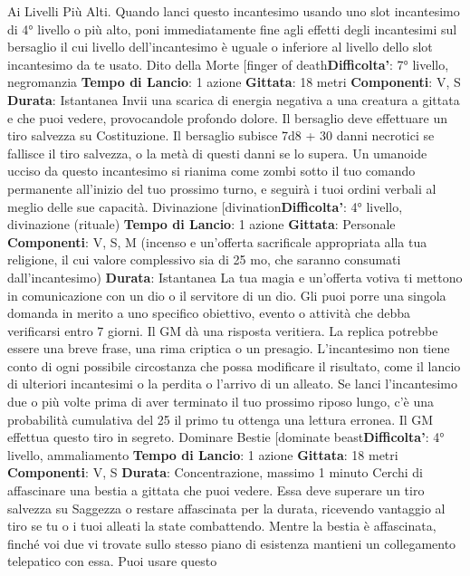 \begin{multicols}{2}
Ai Livelli Più Alti. Quando lanci questo incantesimo
usando uno slot incantesimo di 4° livello o più alto, poni
immediatamente fine agli effetti degli incantesimi sul
bersaglio il cui livello dell’incantesimo è uguale o
inferiore al livello dello slot incantesimo da te usato.
Dito della Morte
[finger of death\textbf{Difficolta'}:
7° livello, negromanzia
\textbf{Tempo di Lancio}: 1 azione
\textbf{Gittata}: 18 metri
\textbf{Componenti}: V, S
\textbf{Durata}: Istantanea
Invii una scarica di energia negativa a una creatura a
gittata e che puoi vedere, provocandole profondo
dolore. Il bersaglio deve effettuare un tiro salvezza su
Costituzione. Il bersaglio subisce 7d8 + 30 danni
necrotici se fallisce il tiro salvezza, o la metà di questi
danni se lo supera.
Un umanoide ucciso da questo incantesimo si rianima
come zombi sotto il tuo comando permanente all’inizio
del tuo prossimo turno, e seguirà i tuoi ordini verbali al
meglio delle sue capacità.
Divinazione
[divination\textbf{Difficolta'}:
4° livello, divinazione (rituale)
\textbf{Tempo di Lancio}: 1 azione
\textbf{Gittata}: Personale
\textbf{Componenti}: V, S, M (incenso e un’offerta sacrificale
appropriata alla tua religione, il cui valore complessivo
sia di 25 mo, che saranno consumati dall’incantesimo)
\textbf{Durata}: Istantanea
La tua magia e un’offerta votiva ti mettono in
comunicazione con un dio o il servitore di un dio. Gli
puoi porre una singola domanda in merito a uno
specifico obiettivo, evento o attività che debba
verificarsi entro 7 giorni. Il GM dà una risposta veritiera.
La replica potrebbe essere una breve frase, una rima
criptica o un presagio.
L’incantesimo non tiene conto di ogni possibile
circostanza che possa modificare il risultato, come il
lancio di ulteriori incantesimi o la perdita o l’arrivo di un
alleato.
Se lanci l’incantesimo due o più volte prima di aver
terminato il tuo prossimo riposo lungo, c’è una
probabilità cumulativa del 25%
il primo tu ottenga una lettura erronea. Il GM effettua
questo tiro in segreto.
Dominare Bestie
[dominate beast\textbf{Difficolta'}:
4° livello, ammaliamento
\textbf{Tempo di Lancio}: 1 azione
\textbf{Gittata}: 18 metri
\textbf{Componenti}: V, S
\textbf{Durata}: Concentrazione, massimo 1 minuto
Cerchi di affascinare una bestia a gittata che puoi
vedere. Essa deve superare un tiro salvezza su
Saggezza o restare affascinata per la durata, ricevendo
vantaggio al tiro se tu o i tuoi alleati la state
combattendo.
Mentre la bestia è affascinata, finché voi due vi trovate
sullo stesso piano di esistenza mantieni un
collegamento telepatico con essa. Puoi usare questo

\end{multicols}
